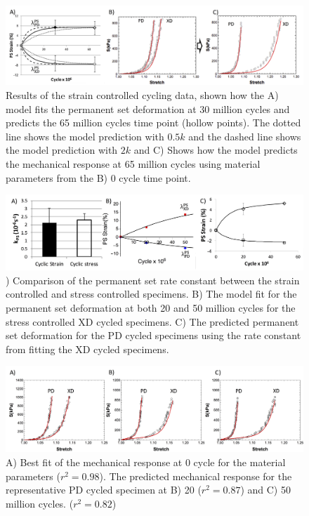 \begin{figure}[hbt]
\centering
\centerline{\includegraphics[width=\textwidth]{Images/chapter4/figure14}}
\caption{Results of the strain controlled cycling data, shown how the A) model fits the permanent set deformation at 30 million cycles and predicts the 65 million cycles time point (hollow points). The dotted line shows the model prediction with $0.5k$ and the dashed line shows the model prediction with $2k$ and C) Shows how the model predicts the mechanical response at 65 million cycles using material parameters from the B) 0 cycle time point.}
\label{fig:strainresults}
\end{figure}

\begin{figure}[hbt]
\centering
\centerline{\includegraphics[width=\textwidth]{Images/chapter4/figure15}}
\caption{) Comparison of the permanent set rate constant between the strain controlled and stress controlled specimens. B) The model fit for the permanent set deformation at both 20 and 50 million cycles for the stress controlled XD cycled specimens.  C) The predicted permanent set deformation for the PD cycled specimens using the rate constant from fitting the XD cycled specimens. }
\label{fig:stressXDdef}
\end{figure}

\begin{figure}[hbt]
\centering
\centerline{\includegraphics[width=\textwidth]{Images/chapter4/figure16}}
\caption{A) Best fit of the mechanical response at 0 cycle for the material parameters ($r^2 = 0.98$). The predicted mechanical response for the representative PD cycled specimen at B) 20 ($r^2 = 0.87$) and C) 50 million cycles. ($r^2 = 0.82$)}
\label{fig:stressPDmech}
\end{figure}


